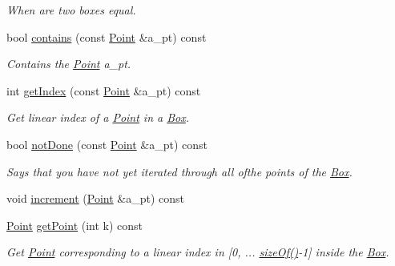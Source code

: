 \begin{DoxyCompactItemize}
\begin{DoxyCompactList}\small\item\em When are two boxes equal. \end{DoxyCompactList}\item 
\hypertarget{classBox_a5af922c141c83b2bb25e522899da5ad5}{}bool \hyperlink{classBox_a5af922c141c83b2bb25e522899da5ad5}{contains} (const \hyperlink{classPoint}{Point} \&a\+\_\+pt) const \label{classBox_a5af922c141c83b2bb25e522899da5ad5}

\begin{DoxyCompactList}\small\item\em Contains the \hyperlink{classPoint}{Point} a\+\_\+pt. \end{DoxyCompactList}\item 
\hypertarget{classBox_a9eb58cb9f4896baa991de834c050d97a}{}int \hyperlink{classBox_a9eb58cb9f4896baa991de834c050d97a}{get\+Index} (const \hyperlink{classPoint}{Point} \&a\+\_\+pt) const \label{classBox_a9eb58cb9f4896baa991de834c050d97a}

\begin{DoxyCompactList}\small\item\em Get linear index of a \hyperlink{classPoint}{Point} in a \hyperlink{classBox}{Box}. \end{DoxyCompactList}\item 
\hypertarget{classBox_a27c222260017eba46f720d8bc2b94b7f}{}bool \hyperlink{classBox_a27c222260017eba46f720d8bc2b94b7f}{not\+Done} (const \hyperlink{classPoint}{Point} \&a\+\_\+pt) const \label{classBox_a27c222260017eba46f720d8bc2b94b7f}

\begin{DoxyCompactList}\small\item\em Says that you have not yet iterated through all ofthe points of the \hyperlink{classBox}{Box}. \end{DoxyCompactList}\item 
void \hyperlink{classBox_a450ac265f84723771d2281785d51d424}{increment} (\hyperlink{classPoint}{Point} \&a\+\_\+pt) const 
\item 
\hypertarget{classBox_a30c40f4155427e7f68704e7607b8de89}{}\hyperlink{classPoint}{Point} \hyperlink{classBox_a30c40f4155427e7f68704e7607b8de89}{get\+Point} (int k) const \label{classBox_a30c40f4155427e7f68704e7607b8de89}

\begin{DoxyCompactList}\small\item\em Get \hyperlink{classPoint}{Point} corresponding to a linear index in \mbox{[}0, ... \hyperlink{classBox_a18e496a4a686a834850b5d9720a1c322}{size\+Of()}-\/1\mbox{]} inside the \hyperlink{classBox}{Box}. \end{DoxyCompactList}\end{DoxyCompactItemize}


